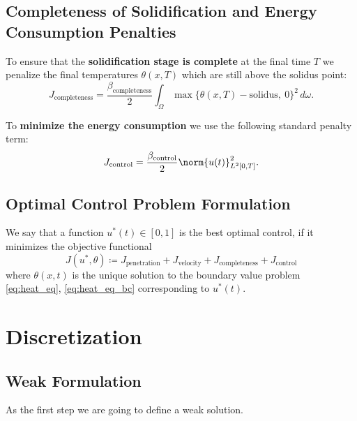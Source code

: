 \subsection{Completeness of Solidification and Energy Consumption Penalties}

To ensure that the \textbf{solidification stage is complete} at the final time $T$ we penalize the final temperatures $\theta(x, T)$ which are still above the solidus point:
\begin{equation}
	J_{\text{completeness}} =
	\frac{\beta_\text{completeness}}{2} \int_{\Omega} \max\{ \theta(x, T) - \text{solidus},\ 0 \}^2\, d\omega.
\end{equation}

To \textbf{minimize the energy consumption} we use the following standard penalty term:
\begin{equation}
	J_{\text{control}} =
	\frac{\beta_\text{control}}{2} \norm{u(t)}^2_{L^2[0,T]}.
\end{equation}



\subsection{Optimal Control Problem Formulation}

{\color{TolHighContrastBlue}
We say that a function $u^*(t) \in [0,1]$ is the best optimal control, if it minimizes the objective functional
\begin{equation} \label{eq:J}
	J(u^*, \theta) \coloneqq J_{\text{penetration}} + J_{\text{velocity}} + J_{\text{completeness}} + J_{\text{control}}
\end{equation}
where $\theta(x, t)$ is the unique solution to the boundary value problem \eqref{eq:heat_eq}, \eqref{eq:heat_eq_bc} corresponding to $u^*(t)$.
}


\section{Discretization}
\label{sec:discretization}

\subsection{Weak Formulation}
As the first step we are going to define a weak solution.

